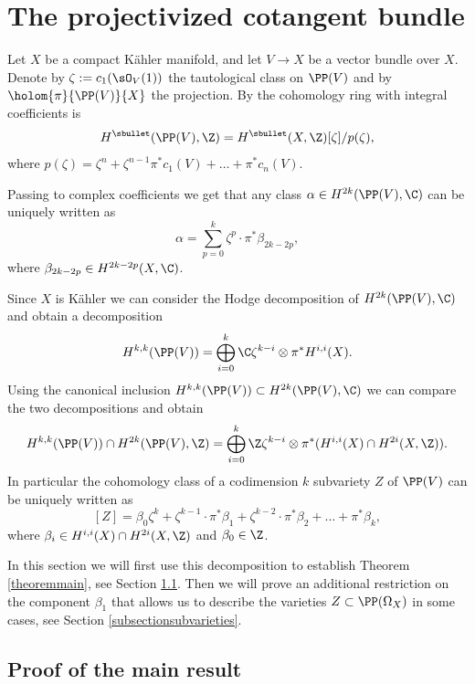 \section{The projectivized cotangent bundle} \label{sectionsubvarieties}

Let $X$ be a compact Kähler manifold,
and let $V \to X$ be a vector bundle over $X$. Denote by $\zeta:=c_1(\sO_V(1))$ the tautological
class on $\PP(V)$ and by $\holom{\pi}{\PP(V)}{X}$ the projection.
By \cite[Chap.\,2]{Kob87} the cohomology ring with integral coefficients is
\[
H^{\sbullet}(\PP(V),\Z)=H^{\sbullet}(X, \Z )[\zeta]/p(\zeta),
\]
where $p(\zeta)=\zeta^n+\zeta^{n-1} \pi^* c_1(V)+ \ldots + \pi^* c_{n}(V)$. 

Passing to complex coefficients we get that any class $\alpha \in H^{2k}(\PP(V),\C) $ can be uniquely written as
\[
\alpha= \sum_{p=0}^{k} \zeta^p \cdot \pi^* \beta_{2k-2p},
\]
where $\beta_{2k-2p} \in H^{2k-2p}(X, \C)$.

Since $X$ is Kähler we can consider the Hodge decomposition
of $H^{2k}(\PP(V),\C)$
and obtain a decomposition
\[
H^{k,k}(\PP(V))=\bigoplus_{i=0}^k \C \zeta^{k-i} \otimes \pi^* H^{i,i}(X).
\]
Using the canonical inclusion $H^{k,k}(\PP(V)) \subset H^{2k}(\PP(V),\C)$
we can compare the two decompositions and obtain
\begin{equation} \label{decomposecohomology}
H^{k,k}(\PP(V))\cap H^{2k}(\PP(V),\Z)=\bigoplus_{i=0}^k \Z \zeta^{k-i} \otimes \pi^* (H^{i,i}(X)\cap H^{2i}(X,\Z ) ).
\end{equation}
In particular the cohomology class of a codimension $k$ subvariety $Z$ of $\PP(V)$ can be uniquely written as
\begin{equation} \label{decompose}
[Z]=\beta_0 \zeta^k + \zeta^{k-1}\cdot \pi^* \beta_1 + \zeta^{k-2}\cdot \pi^* \beta_2 + \ldots + \pi^* \beta_k,
\end{equation}
where $\beta_i\in H^{i,i}(X)\cap H^{2i}(X,\Z )$ and $\beta_0 \in \Z$.

In this section we will first use this decomposition to establish Theorem \ref{theoremmain}, see Section \ref{subsectionproofmain}.
Then we will prove an additional restriction on the component $\beta_1$ that allows us
to describe the varieties $Z \subset \PP(\Omega_X)$ in some cases, see Section \ref{subsectionsubvarieties}.

\subsection{Proof of the main result} \label{subsectionproofmain}

